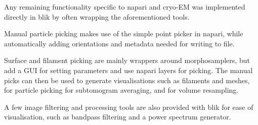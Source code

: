 Any remaining functionality specific to napari and cryo-EM was implemented directly in blik by often wrapping the aforementioned tools.

Manual particle picking makes use of the simple point picker in napari, while automatically adding orientations and metadata needed for writing to file.

Surface and filament picking are mainly wrappers around morphosamplers, but add a GUI for setting parameters and use napari layers for picking. The manual picks can then be used to generate visualisations such as filaments and meshes, for particle picking for subtomogram averaging, and for volume resampling.

A few image filtering and processing tools are also provided with blik for ease of visualisation, such as bandpass filtering and a power spectrum generator.
